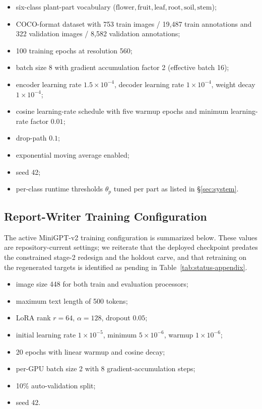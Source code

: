 \begin{itemize}[leftmargin=1.3em]
\item six-class plant-part vocabulary ($\mathrm{flower}, \mathrm{fruit},
\mathrm{leaf}, \mathrm{root}, \mathrm{soil}, \mathrm{stem}$);
\item COCO-format dataset with 753 train images / 19{,}487 train
annotations and 322 validation images / 8{,}582 validation annotations;
\item 100 training epochs at resolution 560;
\item batch size 8 with gradient accumulation factor 2 (effective
batch 16);
\item encoder learning rate $1.5\times 10^{-4}$, decoder learning rate
$1\times 10^{-4}$, weight decay $1\times 10^{-4}$;
\item cosine learning-rate schedule with five warmup epochs and minimum
learning-rate factor $0.01$;
\item drop-path $0.1$;
\item exponential moving average enabled;
\item seed 42;
\item per-class runtime thresholds $\theta_p$ tuned per part as listed
in \S\ref{sec:system}.
\end{itemize}

\subsection{Report-Writer Training Configuration}

The active MiniGPT-v2 training configuration is summarized below. These
values are repository-current settings; we reiterate that the deployed
checkpoint predates the constrained stage-2 redesign and the holdout
carve, and that retraining on the regenerated targets is identified as
pending in Table~\ref{tab:status-appendix}.

\begin{itemize}[leftmargin=1.3em]
\item image size 448 for both train and evaluation processors;
\item maximum text length of 500 tokens;
\item LoRA rank $r=64$, $\alpha=128$, dropout $0.05$;
\item initial learning rate $1\times 10^{-5}$, minimum
$5\times 10^{-6}$, warmup $1\times 10^{-6}$;
\item 20 epochs with linear warmup and cosine decay;
\item per-GPU batch size 2 with 8 gradient-accumulation steps;
\item 10\% auto-validation split;
\item seed 42.
\end{itemize}

